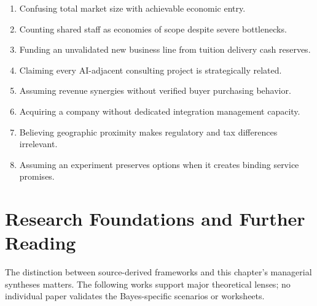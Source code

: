 \begin{enumerate}
    \item Confusing total market size with achievable economic entry.
    \item Counting shared staff as economies of scope despite severe bottlenecks.
    \item Funding an unvalidated new business line from tuition delivery cash reserves.
    \item Claiming every AI-adjacent consulting project is strategically related.
    \item Assuming revenue synergies without verified buyer purchasing behavior.
    \item Acquiring a company without dedicated integration management capacity.
    \item Believing geographic proximity makes regulatory and tax differences irrelevant.
    \item Assuming an experiment preserves options when it creates binding service promises.
\end{enumerate}

\section*{Research Foundations and Further Reading}
\label{sec:research_foundations_adjacencies}

The distinction between source-derived frameworks and this chapter's managerial syntheses matters. The following works support major theoretical lenses; no individual paper validates the Bayes-specific scenarios or worksheets.


